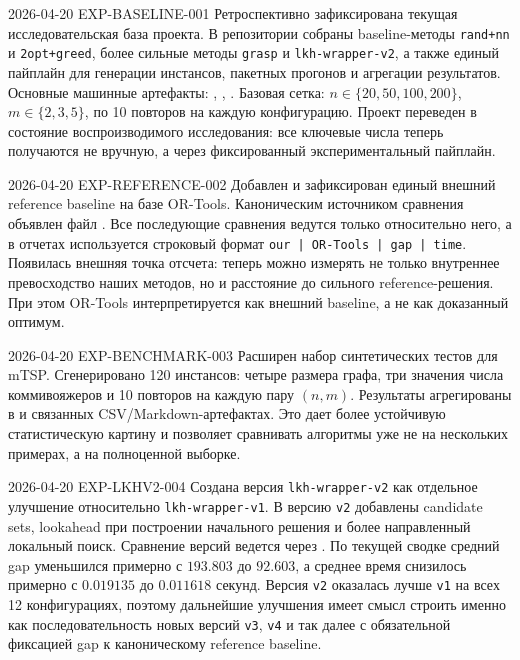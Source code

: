 \ExperimentEntry
  {2026-04-20}
  {EXP-BASELINE-001}
  {Ретроспективно зафиксирована текущая исследовательская база проекта. В репозитории собраны baseline-методы \texttt{rand+nn} и \texttt{2opt+greed}, более сильные методы \texttt{grasp} и \texttt{lkh-wrapper-v2}, а также единый пайплайн для генерации инстансов, пакетных прогонов и агрегации результатов.}
  {Основные машинные артефакты: , , . Базовая сетка: $n \in \{20, 50, 100, 200\}$, $m \in \{2, 3, 5\}$, по 10 повторов на каждую конфигурацию.}
  {Проект переведен в состояние воспроизводимого исследования: все ключевые числа теперь получаются не вручную, а через фиксированный экспериментальный пайплайн.}

\ExperimentEntry
  {2026-04-20}
  {EXP-REFERENCE-002}
  {Добавлен и зафиксирован единый внешний reference baseline на базе OR-Tools.}
  {Каноническим источником сравнения объявлен файл . Все последующие сравнения ведутся только относительно него, а в отчетах используется строковый формат \texttt{our | OR-Tools | gap | time}.}
  {Появилась внешняя точка отсчета: теперь можно измерять не только внутреннее превосходство наших методов, но и расстояние до сильного reference-решения. При этом OR-Tools интерпретируется как внешний baseline, а не как доказанный оптимум.}

\ExperimentEntry
  {2026-04-20}
  {EXP-BENCHMARK-003}
  {Расширен набор синтетических тестов для mTSP.}
  {Сгенерировано 120 инстансов: четыре размера графа, три значения числа коммивояжеров и 10 повторов на каждую пару $(n, m)$. Результаты агрегированы в  и связанных CSV/Markdown-артефактах.}
  {Это дает более устойчивую статистическую картину и позволяет сравнивать алгоритмы уже не на нескольких примерах, а на полноценной выборке.}

\ExperimentEntry
  {2026-04-20}
  {EXP-LKHV2-004}
  {Создана версия \texttt{lkh-wrapper-v2} как отдельное улучшение относительно \texttt{lkh-wrapper-v1}. В версию \texttt{v2} добавлены candidate sets, lookahead при построении начального решения и более направленный локальный поиск.}
  {Сравнение версий ведется через . По текущей сводке средний gap уменьшился примерно с $193.803$ до $92.603$, а среднее время снизилось примерно с $0.019135$ до $0.011618$ секунд.}
  {Версия \texttt{v2} оказалась лучше \texttt{v1} на всех 12 конфигурациях, поэтому дальнейшие улучшения имеет смысл строить именно как последовательность новых версий \texttt{v3}, \texttt{v4} и так далее с обязательной фиксацией gap к каноническому reference baseline.}

